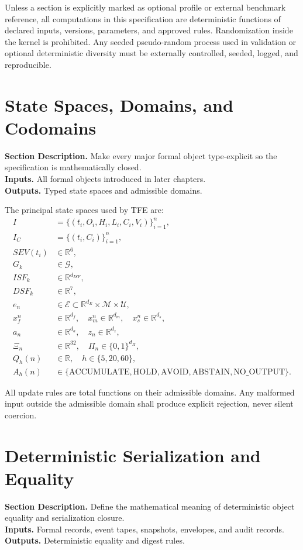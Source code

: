\documentclass[11pt]{report}
\newcommand{\meta}[3]{\textbf{Section Description.} #1\\
\textbf{Inputs.} #2\\
\textbf{Outputs.} #3\par}
\begin{document}
Unless a section is explicitly marked as optional profile or external benchmark reference, all computations in this specification are deterministic functions of declared inputs, versions, parameters, and approved rules. Randomization inside the kernel is prohibited. Any seeded pseudo-random process used in validation or optional deterministic diversity must be externally controlled, seeded, logged, and reproducible.


\section{State Spaces, Domains, and Codomains}
\meta{Make every major formal object type-explicit so the specification is mathematically closed.}{All formal objects introduced in later chapters.}{Typed state spaces and admissible domains.}

The principal state spaces used by TFE are:
\begin{align*}
I &= \{(t_i,O_i,H_i,L_i,C_i,V_i)\}_{i=1}^{n},\\
I_C &= \{(t_i,C_i)\}_{i=1}^{n},\\
SEV(t_i) &\in \mathbb{R}^{6},\\
G_k &\in \mathcal{G},\\
ISF_k &\in \mathbb{R}^{d_{ISF}},\\
DSF_k &\in \mathbb{R}^{7},\\
e_n &\in \mathcal{E}\subset \mathbb{R}^{d_E}\times\mathcal{M}\times\mathcal{U},\\
x_f^n &\in \mathbb{R}^{d_f},\quad x_m^n \in \mathbb{R}^{d_m},\quad x_s^n\in\mathbb{R}^{d_s},\\
a_n &\in \mathbb{R}^{d_a},\quad z_n\in\mathbb{R}^{d_z},\\
\Xi_n &\in \mathbb{R}^{32},\quad \Pi_n\in\{0,1\}^{d_{\Pi}},\\
Q_h(n) &\in \mathbb{R},\quad h\in\{5,20,60\},\\
A_h(n) &\in \{\text{ACCUMULATE},\text{HOLD},\text{AVOID},\text{ABSTAIN},\text{NO\_OUTPUT}\}.
\end{align*}

All update rules are total functions on their admissible domains. Any malformed input outside the admissible domain shall produce explicit rejection, never silent coercion.

\section{Deterministic Serialization and Equality}
\meta{Define the mathematical meaning of deterministic object equality and serialization closure.}{Formal records, event tapes, snapshots, envelopes, and audit records.}{Deterministic equality and digest rules.}
\end{document}
